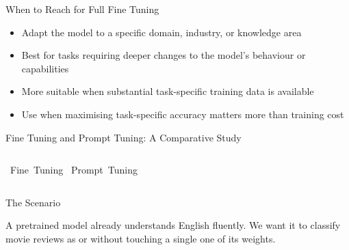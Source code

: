 \documentclass[aspectratio=169,10pt]{beamer}
\begin{document}
\begin{frame}{When to Reach for Full Fine Tuning}
  \begin{itemize}\itemsep11pt
    \item {} Adapt the model to a specific domain, industry, or knowledge area
    \item {} Best for tasks requiring deeper changes to the model's behaviour or capabilities
    \item {} More suitable when substantial task-specific training data is available
    \item {} Use when maximising task-specific accuracy matters more than training cost
  \end{itemize}
\end{frame}

\begin{frame}{Fine Tuning and Prompt Tuning: A Comparative Study}
  \vskip0.1cm
  \begin{columns}[c]
    \hspace{0.8cm}%
      \small
      \mbox{\ Fine Tuning}
      \vskip0.45cm
      \mbox{\ Prompt Tuning}
      \centering
      \resizebox{!}{5.4cm}{\ptradar}
  \end{columns}
  \vskip0.15cm
\end{frame}



\begin{frame}{The Scenario}

  \big A pretrained model already understands English fluently. We want it to classify
  movie reviews as  or  without touching a single one
  of its weights. 
  \vskip0.3cm
  
  \centering
  \resizebox{0.92\textwidth}{!}{\ptwexscenario}
  \vskip0.1cm

\end{frame}
\end{document}
